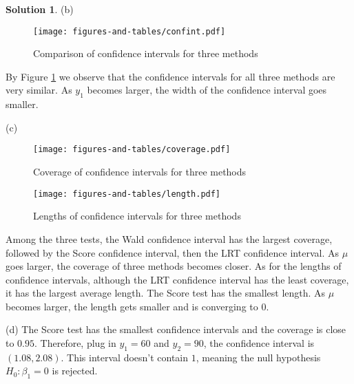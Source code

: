 \documentclass[11pt,letterpaper,english,oneside]{article} %
\theoremstyle{definition} %
\newtheorem{solution}{Solution}
\newenvironment{sol}{\begin{solution}\hspace{0pt}}{\end{solution}}
\begin{document}
\begin{sol}
(b)
	\begin{figure}[ht]
	\centering
	\texttt{[image: figures-and-tables/confint.pdf]}
	\caption{Comparison of confidence intervals for three methods}
	\label{fig:confint}
\end{figure}
By Figure \ref{fig:confint} we observe that the confidence intervals for all three methods are very similar. As $y_1$ becomes larger, the width of the confidence interval goes smaller.

(c)
	\begin{figure}[ht]
	\centering
	\texttt{[image: figures-and-tables/coverage.pdf]}
	\caption{Coverage of confidence intervals for three methods}
	\label{fig:coverage}
\end{figure}
	\begin{figure}[ht]
	\centering
	\texttt{[image: figures-and-tables/length.pdf]}
	\caption{Lengths of confidence intervals for three methods}
	\label{fig:length}
\end{figure}

Among the three tests, the Wald confidence interval has the largest coverage, followed by the Score confidence interval, then the LRT confidence interval. As $\mu$ goes larger, the coverage of three methods becomes closer. As for the lengths of confidence intervals, although the LRT confidence interval has the least coverage, it has the largest average length. The Score test has the smallest length. As $\mu$ becomes larger, the length gets smaller and is converging to 0.

(d) The Score test has the smallest confidence intervals and the coverage is close to $0.95$. Therefore, plug in $y_1=60$ and $y_2=90$, the confidence interval is $(1.08,2.08)$. This interval doesn't contain $1$, meaning the null hypothesis $H_0:\beta_1=0$ is rejected.

\end{sol}
\end{document}
